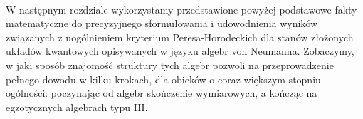 \paragraph{}
W następnym rozdziale wykorzystamy przedstawione powyżej podstawowe fakty
matematyczne do precyzyjnego sformułowania i udowodnienia wyników związanych
z uogólnieniem kryterium Peresa-Horodeckich dla stanów złożonych układów
kwantowych opisywanych w języku algebr von Neumanna.
Zobaczymy,
w jaki sposób znajomość struktury tych algebr pozwoli na przeprowadzenie
pełnego dowodu w kilku krokach, dla obieków o coraz większym stopniu ogólności:
poczynając od algebr skończenie wymiarowych,
a kończąc na egzotycznych algebrach typu III.


%


\paragraph{}
